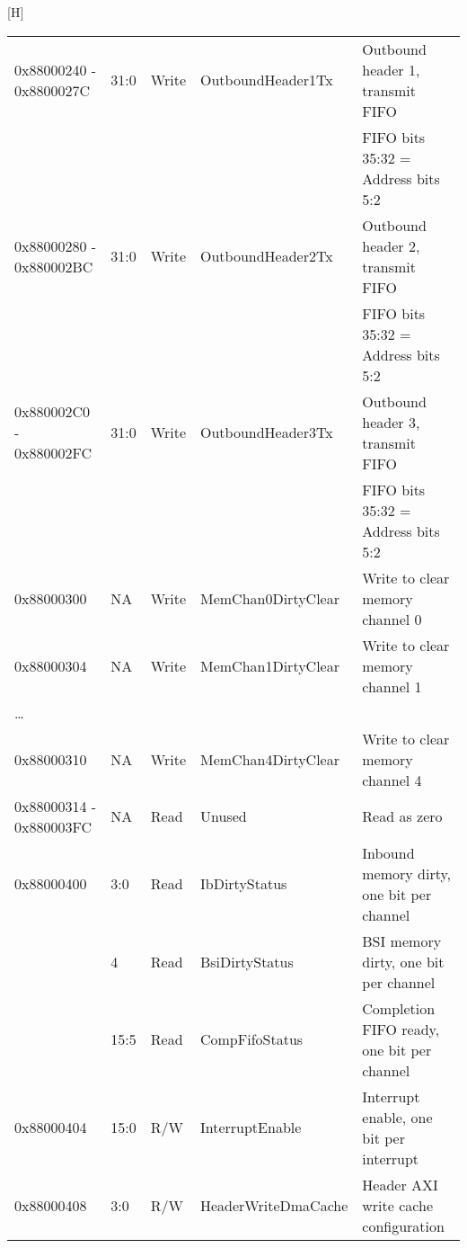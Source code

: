 \documentclass[11pt]{article}
\begin{document}
\begin{center}[H]
\begin{longtable}{| l | l | l | l | l | }
      \hline 0x88000240 - 0x8800027C & 31:0  & Write & OutboundHeader1Tx    & Outbound header 1, transmit FIFO               \\
                                     &       &       &                      & FIFO bits 35:32 = Address bits 5:2             \\
      \hline 0x88000280 - 0x880002BC & 31:0  & Write & OutboundHeader2Tx    & Outbound header 2, transmit FIFO               \\
                                     &       &       &                      & FIFO bits 35:32 = Address bits 5:2             \\
      \hline 0x880002C0 - 0x880002FC & 31:0  & Write & OutboundHeader3Tx    & Outbound header 3, transmit FIFO               \\
                                     &       &       &                      & FIFO bits 35:32 = Address bits 5:2             \\
      \hline 0x88000300              & NA    & Write & MemChan0DirtyClear   & Write to clear memory channel 0                \\
      \hline 0x88000304              & NA    & Write & MemChan1DirtyClear   & Write to clear memory channel 1                \\
             \ldots                  &       &       &                      &                                                \\
      \hline 0x88000310              & NA    & Write & MemChan4DirtyClear   & Write to clear memory channel 4                \\
      \hline 0x88000314 - 0x880003FC & NA    & Read  & Unused               & Read as zero                                   \\
      \hline 0x88000400              & 3:0   & Read  & IbDirtyStatus        & Inbound memory dirty, one bit per channel \\
                                     & 4     & Read  & BsiDirtyStatus       & BSI memory dirty, one bit per channel \\
                                     & 15:5  & Read  & CompFifoStatus       & Completion FIFO ready, one bit per channel \\
      \hline 0x88000404              & 15:0  & R/W   & InterruptEnable      & Interrupt enable, one bit per interrupt        \\
      \hline 0x88000408              & 3:0   & R/W   & HeaderWriteDmaCache  & Header AXI write cache configuration           \\

\end{longtable}
\end{center}
\end{document}
